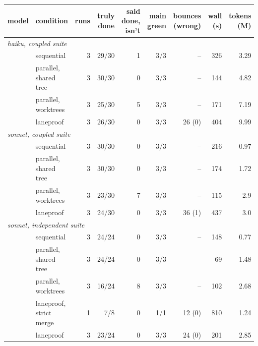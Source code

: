\begin{tabular}{llrrrrrrr}
\toprule
model & condition & runs & truly done & said done, isn't & main green & bounces (wrong) & wall (s) & tokens (M) \\
\midrule
\multicolumn{9}{l}{\emph{haiku, coupled suite}} \\
& sequential & 3 & 29/30 & 1 & 3/3 & -- & 326 & 3.29 \\
& parallel, shared tree & 3 & 30/30 & 0 & 3/3 & -- & 144 & 4.82 \\
& parallel, worktrees & 3 & 25/30 & 5 & 3/3 & -- & 171 & 7.19 \\
& laneproof & 3 & 26/30 & 0 & 3/3 & 26 (0) & 404 & 9.99 \\
\midrule
\multicolumn{9}{l}{\emph{sonnet, coupled suite}} \\
& sequential & 3 & 30/30 & 0 & 3/3 & -- & 216 & 0.97 \\
& parallel, shared tree & 3 & 30/30 & 0 & 3/3 & -- & 174 & 1.72 \\
& parallel, worktrees & 3 & 23/30 & 7 & 3/3 & -- & 115 & 2.9 \\
& laneproof & 3 & 24/30 & 0 & 3/3 & 36 (1) & 437 & 3.0 \\
\midrule
\multicolumn{9}{l}{\emph{sonnet, independent suite}} \\
& sequential & 3 & 24/24 & 0 & 3/3 & -- & 148 & 0.77 \\
& parallel, shared tree & 3 & 24/24 & 0 & 3/3 & -- & 69 & 1.48 \\
& parallel, worktrees & 3 & 16/24 & 8 & 3/3 & -- & 102 & 2.68 \\
& laneproof, strict merge & 1 & 7/8 & 0 & 1/1 & 12 (0) & 810 & 1.24 \\
& laneproof & 3 & 23/24 & 0 & 3/3 & 24 (0) & 201 & 2.85 \\
\bottomrule
\end{tabular}
